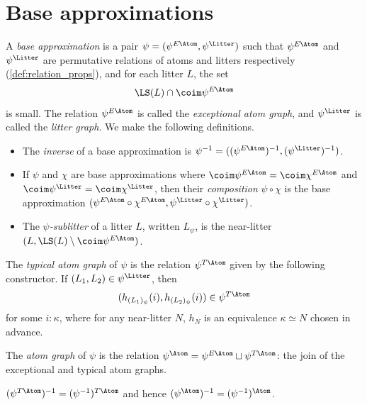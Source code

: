 \section{Base approximations}
\begin{definition}
  \label{def:BaseApprox}
  \leanok
  A \emph{base approximation} is a pair \( \psi = (\psi^{E\Atom}, \psi^\Litter) \) such that \( \psi^{E\Atom} \) and \( \psi^\Litter \) are permutative relations of atoms and litters respectively (\cref{def:relation_props}), and for each litter \( L \), the set
  \[ \LS(L) \cap \coim \psi^{E\Atom} \]
  is small.
  The relation \( \psi^{E\Atom} \) is called the \emph{exceptional atom graph}, and \( \psi^\Litter \) is called the \emph{litter graph}.
  We make the following definitions.
  \begin{itemize}
    \item The \emph{inverse} of a base approximation is \( \psi^{-1} = ((\psi^{E\Atom})^{-1}, (\psi^\Litter)^{-1}) \).
    \item If \( \psi \) and \( \chi \) are base approximations where \( \coim \psi^{E\Atom} = \coim \chi^{E\Atom} \) and \( \coim \psi^\Litter = \coim \chi^\Litter \), then their \emph{composition} \( \psi \circ \chi \) is the base approximation \( (\psi^{E\Atom} \circ \chi^{E\Atom}, \psi^\Litter \circ \chi^\Litter) \).
    \item The \emph{\( \psi \)-sublitter} of a litter \( L \), written \( L_\psi \), is the near-litter \( (L, \LS(L) \setminus \coim \psi^{E\Atom}) \).
  \end{itemize}
\end{definition}
\begin{definition}
  \label{def:atomGraph}
  \leanok
  The \emph{typical atom graph} of \( \psi \) is the relation \( \psi^{T\Atom} \) given by the following constructor.
  If \( (L_1, L_2) \in \psi^\Litter \), then
  \[ (h_{(L_1)_\psi}(i), h_{(L_2)_\psi}(i)) \in \psi^{T\Atom} \]
  for some \( i : \kappa \), where for any near-litter \( N \), \( h_N \) is an equivalence \( \kappa \simeq N \) chosen in advance.

  The \emph{atom graph} of \( \psi \) is the relation \( \psi^\Atom = \psi^{E\Atom} \sqcup \psi^{T\Atom} \): the join of the exceptional and typical atom graphs.
\end{definition}
\begin{proposition}
  \label{prop:atomGraph_inv}
  \leanok
  \( (\psi^{T\Atom})^{-1} = (\psi^{-1})^{T\Atom} \) and hence \( (\psi^\Atom)^{-1} = (\psi^{-1})^\Atom \).
\end{proposition}
